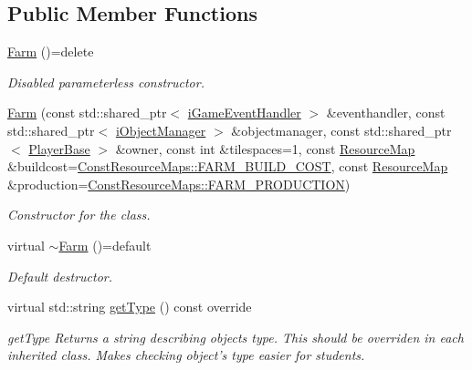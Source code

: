 \subsection*{Public Member Functions}
\begin{DoxyCompactItemize}
\item 
\hyperlink{classCourse_1_1Farm_a3b92d4bdac7e8f7fd1f648bb1a4a2490}{Farm} ()=delete
\begin{DoxyCompactList}\small\item\em Disabled parameterless constructor. \end{DoxyCompactList}\item 
\hyperlink{classCourse_1_1Farm_a01270b705f0bc18f2fc4c5c31f41cf3b}{Farm} (const std\-::shared\-\_\-ptr$<$ \hyperlink{classCourse_1_1iGameEventHandler}{i\-Game\-Event\-Handler} $>$ \&eventhandler, const std\-::shared\-\_\-ptr$<$ \hyperlink{classCourse_1_1iObjectManager}{i\-Object\-Manager} $>$ \&objectmanager, const std\-::shared\-\_\-ptr$<$ \hyperlink{classCourse_1_1PlayerBase}{Player\-Base} $>$ \&owner, const int \&tilespaces=1, const \hyperlink{namespaceCourse_ab9a46ed9cd00485e318e5731ea2f78d9}{Resource\-Map} \&buildcost=\hyperlink{namespaceCourse_1_1ConstResourceMaps_a4919571a8aa47de7c6e513de147642ef}{Const\-Resource\-Maps\-::\-F\-A\-R\-M\-\_\-\-B\-U\-I\-L\-D\-\_\-\-C\-O\-S\-T}, const \hyperlink{namespaceCourse_ab9a46ed9cd00485e318e5731ea2f78d9}{Resource\-Map} \&production=\hyperlink{namespaceCourse_1_1ConstResourceMaps_ac05142db09e7f1f85c7d936356a35df2}{Const\-Resource\-Maps\-::\-F\-A\-R\-M\-\_\-\-P\-R\-O\-D\-U\-C\-T\-I\-O\-N})
\begin{DoxyCompactList}\small\item\em Constructor for the class. \end{DoxyCompactList}\item 
virtual \hyperlink{classCourse_1_1Farm_a99c06d0eeb549a04390bd260cc7ac68d}{$\sim$\-Farm} ()=default
\begin{DoxyCompactList}\small\item\em Default destructor. \end{DoxyCompactList}\item 
virtual std\-::string \hyperlink{classCourse_1_1Farm_a54ade72809a36d31e0e426eb79d6251a}{get\-Type} () const override
\begin{DoxyCompactList}\small\item\em get\-Type Returns a string describing objects type. This should be overriden in each inherited class. Makes checking object's type easier for students. \end{DoxyCompactList}\end{DoxyCompactItemize}

